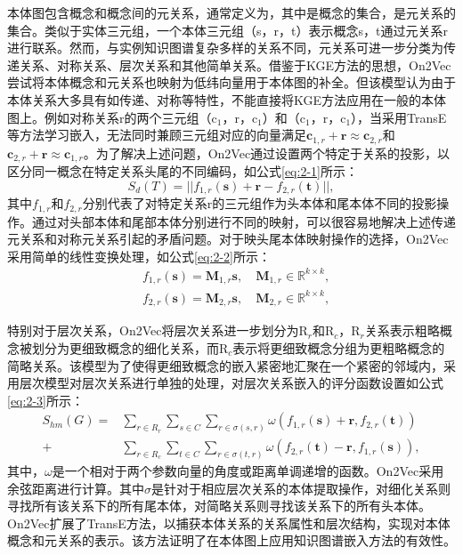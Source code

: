 本体图包含概念和概念间的元关系，通常定义为，其中是概念的集合，是元关系的集合。类似于实体三元组，一个本体三元组（s，r，t）表示概念s，t通过元关系r进行联系。然而，与实例知识图谱复杂多样的关系不同，元关系可进一步分类为传递关系、对称关系、层次关系和其他简单关系\cite{chen2018on2vec}。借鉴于KGE方法的思想，On2Vec\cite{chen2018on2vec}尝试将本体概念和元关系也映射为低纬向量用于本体图的补全。但该模型认为由于本体关系大多具有如传递、对称等特性，不能直接将KGE方法应用在一般的本体图上。例如对称关系r的两个三元组（c$_{1}$，r，c$_{1}$）和（c$_{1}$，r，c$_{1}$），当采用TransE等方法学习嵌入，无法同时兼顾三元组对应的向量满足\(\textbf{c}_{1,r} + \textbf{r} ≈ \textbf{c}_{2,r}\)和\(\textbf{c}_{2,r} + \textbf{r} ≈ \textbf{c}_{1,r}\)。为了解决上述问题，On2Vec通过设置两个特定于关系的投影，以区分同一概念在特定关系头尾的不同编码，如公式\ref{eq:2-1}所示：
\begin{equation}
  S_{d}(T) = || f_{1,r}(\textbf{s}) + \textbf{r} -f_{2,r}(\textbf{t})||,\label{eq:2-1}
\end{equation}
其中\(f_{1,r}\)和\(f_{2,r}\)分别代表了对特定关系r的三元组作为头本体和尾本体不同的投影操作。通过对头部本体和尾部本体分别进行不同的映射，可以很容易地解决上述传递元关系和对称元关系引起的矛盾问题。对于映头尾本体映射操作的选择，On2Vec采用简单的线性变换处理，如公式\ref{eq:2-2}所示：
\begin{equation}
  \begin{aligned} 
    &f_{1,r}(\textbf{s}) = \textbf{M}_{1,r}\textbf{s}, \quad\textbf{M}_{1,r} \in \mathbb{R}^{k \times k}, \\
    &f_{2,r}(\textbf{s}) = \textbf{M}_{2,r}\textbf{s}, \quad\textbf{M}_{2,r} \in \mathbb{R}^{k \times k},
    \end{aligned} \label{eq:2-2}
\end{equation}

特别对于层次关系，On2Vec将层次关系进一步划分为R$_{r}$和R$_{c}$，R$_{r}$关系表示粗略概念被划分为更细致概念的细化关系，而R$_{c}$表示将更细致概念分组为更粗略概念的简略关系。该模型为了使得更细致概念的嵌入紧密地汇聚在一个紧密的邻域内，采用层次模型对层次关系进行单独的处理，对层次关系嵌入的评分函数设置如公式\ref{eq:2-3}所示：
\begin{equation}
  \begin{aligned} 
    S_{hm}(G) = &\sum_{r\in R_{r}} \sum_{s\in C} \sum_{r\in \sigma(s,r)} \omega(f_{1,r}(\textbf{s}) + \textbf{r},f_{2,r}(\textbf{t}))\\
    + &\sum_{r\in R_{c}} \sum_{t\in C} \sum_{r\in \sigma(t,r)} \omega(f_{2,r}(\textbf{t}) -\textbf{r},f_{1,r}(\textbf{s})),
    \end{aligned} \label{eq:2-3}
\end{equation}
其中，\(\omega\)是一个相对于两个参数向量的角度或距离单调递增的函数。On2Vec采用余弦距离进行计算。其中\(\sigma\)是针对于相应层次关系的本体提取操作，对细化关系则寻找所有该关系下的所有尾本体，对简略关系则寻找该关系下的所有头本体。On2Vec扩展了TransE方法，以捕获本体关系的关系属性和层次结构，实现对本体概念和元关系的表示。该方法证明了在本体图上应用知识图谱嵌入方法的有效性。

